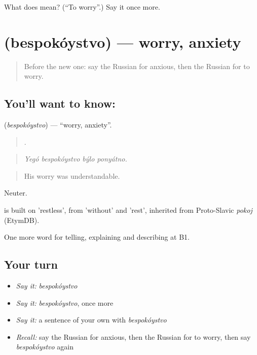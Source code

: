 \begin{tcolorbox}[breakable,colback=teal!4,colframe=teal!35!black,title={Before you move on}]
What does  mean? (\textquotedblleft{}To worry\textquotedblright{}.) Say it once more.
\end{tcolorbox}
\section[\texorpdfstring{\ru{беспокойство} (bespokóystvo)}{беспокойство (bespokóystvo)}]{ (bespokóystvo) — worry, anxiety}

\label{lesson:RU-C474-bespokoystvo}



\begin{quote}
Before the new one: say the Russian for anxious, then the Russian for to worry.
\end{quote}

\subsection*{You'll want to know: }
\textbf{} (\emph{bespokóystvo}) — \textquotedblleft{}worry, anxiety\textquotedblright{}.

\begin{quote}
   .
\end{quote}

\begin{quote}
\emph{Yegó bespokóystvo býlo ponyátno.}
\end{quote}

\begin{quote}
His worry was understandable.
\end{quote}

Neuter.

\begin{cousinweb}
\emph{} is built on \emph{} 'restless', from \emph{} 'without' and \emph{} 'rest', inherited from Proto-Slavic \emph{pokoj} (EtymDB).
\end{cousinweb}

\begin{grammarlens}[title={What you've built}]
One more word for telling, explaining and describing at B1.
\end{grammarlens}

\subsection*{Your turn}
\begin{itemize}
\raggedright
  \item \emph{Say it:} \emph{bespokóystvo}
  \item \emph{Say it:} \emph{bespokóystvo}, once more
  \item \emph{Say it:} a sentence of your own with \emph{bespokóystvo}
  \item \emph{Recall:} say the Russian for anxious, then the Russian for to worry, then say \emph{bespokóystvo} again
\end{itemize}

